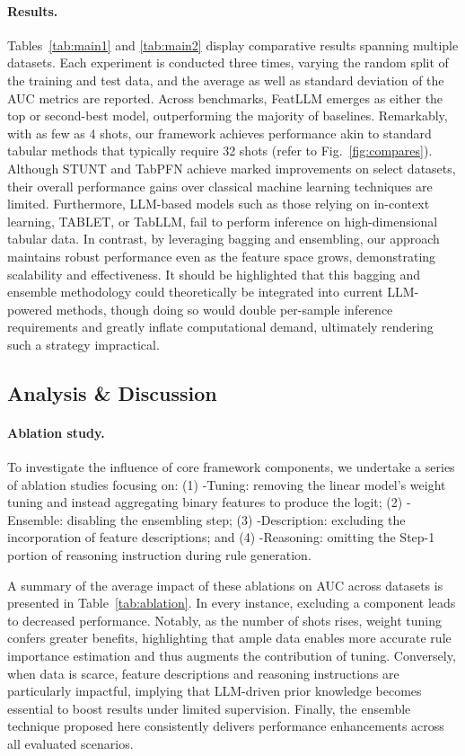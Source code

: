 \vspace*{-0.12in}
\paragraph{Results.}
Tables~\ref{tab:main1} and \ref{tab:main2} display comparative results spanning multiple datasets. Each experiment is conducted three times, varying the random split of the training and test data, and the average as well as standard deviation of the AUC metrics are reported. Across benchmarks, \textsf{FeatLLM} emerges as either the top or second-best model, outperforming the majority of baselines. Remarkably, with as few as 4 shots, our framework achieves performance akin to standard tabular methods that typically require 32 shots (refer to Fig.~\ref{fig:compares}). Although STUNT and TabPFN achieve marked improvements on select datasets, their overall performance gains over classical machine learning techniques are limited. Furthermore, LLM-based models such as those relying on in-context learning, TABLET, or TabLLM, fail to perform inference on high-dimensional tabular data. In contrast, by leveraging bagging and ensembling, our approach maintains robust performance even as the feature space grows, demonstrating scalability and effectiveness. It should be highlighted that this bagging and ensemble methodology could theoretically be integrated into current LLM-powered methods, though doing so would double per-sample inference requirements and greatly inflate computational demand, ultimately rendering such a strategy impractical.

\subsection{Analysis \& Discussion}
\label{sec:analysis}
\paragraph{Ablation study.} To investigate the influence of core framework components, we undertake a series of ablation studies focusing on: (1) \textsf{-Tuning}: removing the linear model's weight tuning and instead aggregating binary features to produce the logit; (2) \textsf{-Ensemble}: disabling the ensembling step; (3) \textsf{-Description}: excluding the incorporation of feature descriptions; and (4) \textsf{-Reasoning}: omitting the Step-1 portion of reasoning instruction during rule generation.

A summary of the average impact of these ablations on AUC across datasets is presented in Table~\ref{tab:ablation}. In every instance, excluding a component leads to decreased performance. Notably, as the number of shots rises, weight tuning confers greater benefits, highlighting that ample data enables more accurate rule importance estimation and thus augments the contribution of tuning. Conversely, when data is scarce, feature descriptions and reasoning instructions are particularly impactful, implying that LLM-driven prior knowledge becomes essential to boost results under limited supervision. Finally, the ensemble technique proposed here consistently delivers performance enhancements across all evaluated scenarios.

